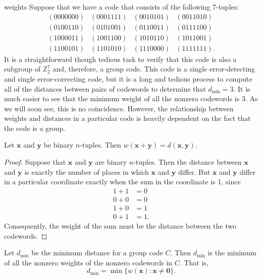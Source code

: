  
\begin{example}{weights}\label{7tuple_weights}
Suppose that we have a code that consists of the following 7-tuples: 
\[
\begin{array}{cccc}
(0000000) & (0001111) & (0010101) & (0011010) \\
(0100110) & (0101001) & (0110011) & (0111100) \\
(1000011) & (1001100) & (1010110) & (1011001) \\
(1100101) & (1101010) & (1110000) & (1111111).
\end{array}
\]
It is a straightforward though tedious task to verify that this code
is also a subgroup of ${\mathbb Z}_2^7$ and, therefore, a group code.
This code is a single error-detecting and single error-correcting 
code, but
it is a long and tedious process to compute all of the distances
between  pairs of codewords to determine that $d_{\min} = 3$. It is
much easier to see that the minimum weight of all the nonzero
codewords is 3. As we will soon see, this is no coincidence.
However, the relationship between weights and distances in a
particular code is heavily dependent on the fact that the code is a
group. 
\end{example}
 
 
\begin{lemma}
Let ${\mathbf x}$ and ${\mathbf y}$ be  binary $n$-tuples. Then $w({\mathbf
x} + {\mathbf y}) = d({\mathbf x}, {\mathbf y})$. 
\end{lemma}
 
 
\begin{proof}
Suppose that ${\mathbf x}$ and ${\mathbf y}$ are binary $n$-tuples. Then
the distance between ${\mathbf x}$ and ${\mathbf y}$ is exactly the number
of places in which ${\mathbf x}$ and ${\mathbf y}$ differ. But ${\mathbf x}$
and ${\mathbf y}$ differ in a particular coordinate exactly when the sum
in the coordinate is 1, since
\begin{align*}
1 + 1 & = 0 \\
0 + 0 & = 0 \\
1 + 0 & = 1 \\
0 + 1 & = 1.
\end{align*}
Consequently, the weight of the sum must be the distance between the two
codewords.
\end{proof}
 
 
\begin{theorem}
Let $d_{\min}$ be the minimum distance for a group code $C$. Then
$d_{\min}$ is the minimum of all the nonzero weights of the nonzero
codewords in $C$. That is, 
\[
d_{\min} = \min\{ w({\mathbf x}) : { {\mathbf x} \neq {\mathbf 0} } \}.
\]
\end{theorem}
 
